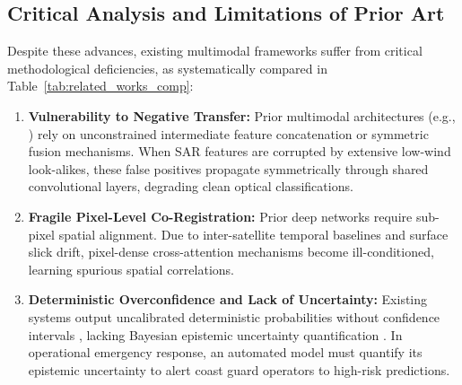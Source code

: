 \documentclass[conference]{IEEEtran}
\begin{document}
\subsection{Critical Analysis and Limitations of Prior Art}
Despite these advances, existing multimodal frameworks suffer from critical methodological deficiencies, as systematically compared in Table~\ref{tab:related_works_comp}:
\begin{enumerate}
    \item \textbf{Vulnerability to Negative Transfer:} Prior multimodal architectures (e.g., \cite{dabbiru2015fusion,wan2025dualbranch,liu2025shnet}) rely on unconstrained intermediate feature concatenation or symmetric fusion mechanisms. When SAR features are corrupted by extensive low-wind look-alikes, these false positives propagate symmetrically through shared convolutional layers, degrading clean optical classifications.
    
    \item \textbf{Fragile Pixel-Level Co-Registration:} Prior deep networks require sub-pixel spatial alignment. Due to inter-satellite temporal baselines and surface slick drift, pixel-dense cross-attention mechanisms \cite{du2025ms3osd,liu2025shnet} become ill-conditioned, learning spurious spatial correlations.
    
    \item \textbf{Deterministic Overconfidence and Lack of Uncertainty:} Existing systems output uncalibrated deterministic probabilities without confidence intervals \cite{guo2017calibration}, lacking Bayesian epistemic uncertainty quantification \cite{gal2016dropout}. In operational emergency response, an automated model must quantify its epistemic uncertainty to alert coast guard operators to high-risk predictions.
\end{enumerate}
\end{document}
